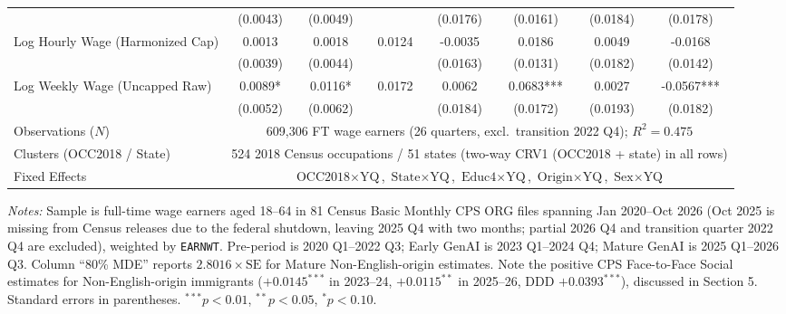 \begin{table}[htbp]
{\begin{tabular}{lccccccc}
 & (0.0043) & (0.0049) & & (0.0176) & (0.0161) & (0.0184) & (0.0178) \\
Log Hourly Wage (Harmonized Cap) & 0.0013 & 0.0018 & 0.0124 & -0.0035 & 0.0186 & 0.0049 & -0.0168 \\
 & (0.0039) & (0.0044) & & (0.0163) & (0.0131) & (0.0182) & (0.0142) \\
Log Weekly Wage (Uncapped Raw) & 0.0089* & 0.0116* & 0.0172 & 0.0062 & 0.0683*** & 0.0027 & -0.0567*** \\
 & (0.0052) & (0.0062) & & (0.0184) & (0.0172) & (0.0193) & (0.0182) \\
\midrule
Observations ($N$) & \multicolumn{7}{c}{609,306 FT wage earners (26 quarters, excl.\ transition 2022 Q4); $R^2 = 0.475$} \\
Clusters (OCC2018 / State) & \multicolumn{7}{c}{524 2018 Census occupations / 51 states (two-way CRV1 (OCC2018 + state) in all rows)} \\
Fixed Effects & \multicolumn{7}{c}{$\text{OCC2018}\times\text{YQ}$, $\text{State}\times\text{YQ}$, $\text{Educ4}\times\text{YQ}$, $\text{Origin}\times\text{YQ}$, $\text{Sex}\times\text{YQ}$} \\
\bottomrule
\end{tabular}%
}
\vspace{4pt}
\begin{minipage}{\textwidth}\scriptsize
\textit{Notes:} Sample is full-time wage earners aged 18--64 in 81 Census Basic Monthly CPS ORG files spanning Jan 2020--Oct 2026 (Oct 2025 is missing from Census releases due to the federal shutdown, leaving 2025 Q4 with two months; partial 2026 Q4 and transition quarter 2022 Q4 are excluded), weighted by \texttt{EARNWT}. Pre-period is 2020 Q1--2022 Q3; Early GenAI is 2023 Q1--2024 Q4; Mature GenAI is 2025 Q1--2026 Q3. Column ``80\% MDE'' reports $2.8016 \times \text{SE}$ for Mature Non-English-origin estimates. Note the positive CPS Face-to-Face Social estimates for Non-English-origin immigrants ($+0.0145^{***}$ in 2023--24, $+0.0115^{**}$ in 2025--26, DDD $+0.0393^{***}$), discussed in Section 5. Standard errors in parentheses. $^{***}p<0.01$, $^{**}p<0.05$, $^{*}p<0.10$.
\end{minipage}
\end{table}
